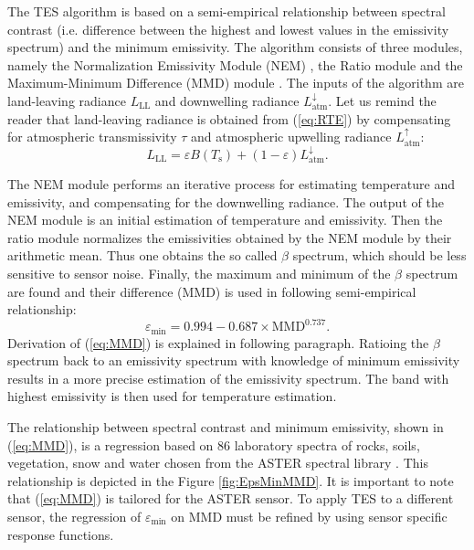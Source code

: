 The TES algorithm is based on a semi-empirical relationship between spectral contrast (i.e. difference between the highest and lowest values in the emissivity spectrum) and the minimum emissivity. The algorithm consists of three modules, namely the Normalization Emissivity Module (NEM) \cite{G86}, the Ratio module and the Maximum-Minimum Difference (MMD) module \cite{M94}. The inputs of the algorithm are land-leaving radiance $L_\mathrm{LL}$ and downwelling radiance $L^{\downarrow}_\mathrm{atm}$. Let us remind the reader that land-leaving radiance is obtained from (\ref{eq:RTE}) by compensating for atmospheric transmissivity $\tau$ and atmospheric upwelling radiance $L^{\uparrow}_\mathrm{atm}$:
\begin{equation}
\label{eq:landleavingRadiance}
L_\mathrm{LL} = \varepsilon B(T_\mathrm{s}) + (1 - \varepsilon) L^\downarrow_\mathrm{atm}.
\end{equation}

The NEM module performs an iterative process for estimating temperature and emissivity, and compensating for the downwelling radiance. The output of the NEM module is an initial estimation of temperature and emissivity. Then the ratio module normalizes the emissivities obtained by the NEM module by their arithmetic mean. Thus one obtains the so called $\beta$ spectrum, which should be less sensitive to sensor noise. Finally, the maximum and minimum of the $\beta$ spectrum are found and their difference (MMD) is used in following semi-empirical relationship:
\begin{equation} 
\label{eq:MMD}
\varepsilon_\mathrm{min} = 0.994 - 0.687 \times \mathrm{MMD}^{0.737}. 
\end{equation}
Derivation of (\ref{eq:MMD}) is explained in following paragraph. Ratioing the $\beta$ spectrum back to an emissivity spectrum with knowledge of minimum emissivity results in a more precise estimation of the emissivity spectrum. The band with highest emissivity is then used for temperature estimation.

The relationship between spectral contrast and minimum emissivity, shown in (\ref{eq:MMD}), is a regression based on 86 laboratory spectra of rocks, soils, vegetation, snow and water chosen from the ASTER spectral library \cite{BH09}. This relationship is depicted in the Figure \ref{fig:EpsMinMMD}. It is important to note that (\ref{eq:MMD}) is tailored for the ASTER sensor. To apply  {TES to a} different sensor,  {the} regression of $\varepsilon_\mathrm{min}$ on MMD  {must be} refined by using sensor specific response functions. 

